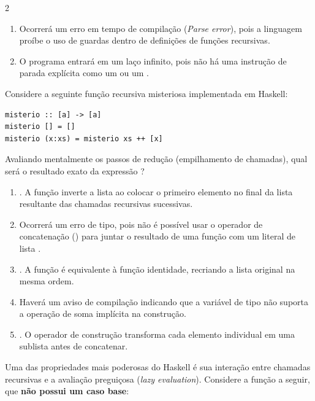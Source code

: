 \documentclass[a4paper,10pt,brazil]{article}
\begin{document}
\begin{multicols}{2}
\begin{enumerate}
  \item Ocorrerá um erro em tempo de compilação (\emph{Parse error}), pois a linguagem proíbe o uso de guardas dentro de definições de funções recursivas.

  \item O programa entrará em um laço infinito, pois não há uma instrução de parada explícita como um  ou um .


\end{enumerate}

Considere a seguinte função recursiva misteriosa implementada em Haskell:

\begin{verbatim}
misterio :: [a] -> [a]
misterio [] = []
misterio (x:xs) = misterio xs ++ [x]
\end{verbatim}

Avaliando mentalmente os passos de redução (empilhamento de chamadas), qual será o resultado exato da expressão ?

\begin{enumerate}
  \item \haskellinline{[3, 2, 1]}. A função inverte a lista ao colocar o primeiro elemento no final da lista resultante das chamadas recursivas sucessivas.

  \item Ocorrerá um erro de tipo, pois não é possível usar o operador de concatenação (\haskellinline{++}) para juntar o resultado de uma função com um literal de lista \haskellinline{[x]}.

  \item \haskellinline{[1, 2, 3]}. A função é equivalente à função identidade, recriando a lista original na mesma ordem.

  \item Haverá um aviso de compilação indicando que a variável de tipo  não suporta a operação de soma implícita na construção.

  \item \haskellinline{[[1], [2], [3]]}. O operador de construção transforma cada elemento individual em uma sublista antes de concatenar.


\end{enumerate}

Uma das propriedades mais poderosas do Haskell é sua interação entre chamadas recursivas e a avaliação preguiçosa (\emph{lazy evaluation}). Considere a função a seguir, que \textbf{não possui um caso base}:


\end{multicols}
\end{document}
